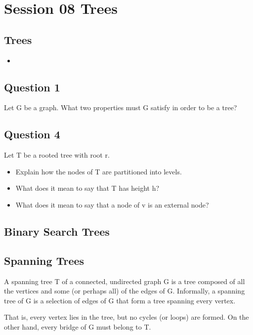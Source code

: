 \documentclass[12pt]{article}
\begin{document}
\section*{Session 08 Trees}
\subsection*{Trees}
\begin{itemize}
\item 
\end{itemize}

\subsection*{Question 1}
Let G be a graph. What two properties must G satisfy in order to be a tree?

\subsection*{Question 4}
Let T be a rooted tree with root r. 

\begin{itemize}
\item Explain how the nodes of T are partitioned into levels.
\item What does it mean to say that T has height h?
\item What does it mean to say that a node of v is an external node?
\end{itemize}

\subsection*{Binary Search Trees}

\subsection*{Spanning Trees}


A spanning tree T of a connected, undirected graph G is a tree composed of all the vertices and some (or perhaps all) of the edges of G. Informally, a spanning tree of G is a selection of edges of G that form a tree spanning every vertex.


 That is, every vertex lies in the tree, but no cycles (or loops) are formed. On the other hand, every bridge of G must belong to T.
 
\end{document}
